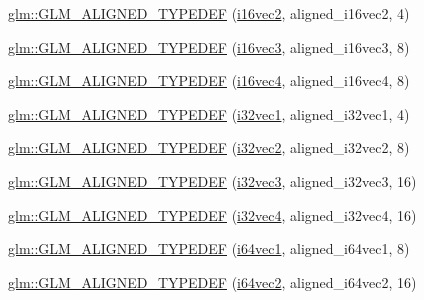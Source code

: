\begin{DoxyCompactItemize}
\hyperlink{group__gtx__type__aligned_ga9d7cb211ccda69b1c22ddeeb0f3e7aba}{glm\+::\+G\+L\+M\+\_\+\+A\+L\+I\+G\+N\+E\+D\+\_\+\+T\+Y\+P\+E\+D\+EF} (\hyperlink{group__gtc__type__precision_ga37af364ff13fb791571dd324dfd3ca89}{i16vec2}, aligned\+\_\+i16vec2, 4)
\item 
\hyperlink{group__gtx__type__aligned_gaaee91dd2ab34423bcc11072ef6bd0f02}{glm\+::\+G\+L\+M\+\_\+\+A\+L\+I\+G\+N\+E\+D\+\_\+\+T\+Y\+P\+E\+D\+EF} (\hyperlink{group__gtc__type__precision_ga85e903f028d903b416a1119b00af57ea}{i16vec3}, aligned\+\_\+i16vec3, 8)
\item 
\hyperlink{group__gtx__type__aligned_ga49f047ccaa8b31fad9f26c67bf9b3510}{glm\+::\+G\+L\+M\+\_\+\+A\+L\+I\+G\+N\+E\+D\+\_\+\+T\+Y\+P\+E\+D\+EF} (\hyperlink{group__gtc__type__precision_gaf074450c0e60b45114084b1df4012a1d}{i16vec4}, aligned\+\_\+i16vec4, 8)
\item 
\hyperlink{group__gtx__type__aligned_ga904e9c2436bb099397c0823506a0771f}{glm\+::\+G\+L\+M\+\_\+\+A\+L\+I\+G\+N\+E\+D\+\_\+\+T\+Y\+P\+E\+D\+EF} (\hyperlink{group__gtc__type__precision_ga05a766bbe2ad0791ed0081baac492da7}{i32vec1}, aligned\+\_\+i32vec1, 4)
\item 
\hyperlink{group__gtx__type__aligned_gaf90651cf2f5e7ee2b11cfdc5a6749534}{glm\+::\+G\+L\+M\+\_\+\+A\+L\+I\+G\+N\+E\+D\+\_\+\+T\+Y\+P\+E\+D\+EF} (\hyperlink{group__gtc__type__precision_ga25820e641988fe33b075d80434872d02}{i32vec2}, aligned\+\_\+i32vec2, 8)
\item 
\hyperlink{group__gtx__type__aligned_ga7354a4ead8cb17868aec36b9c30d6010}{glm\+::\+G\+L\+M\+\_\+\+A\+L\+I\+G\+N\+E\+D\+\_\+\+T\+Y\+P\+E\+D\+EF} (\hyperlink{group__gtc__type__precision_gab67e08f6a4b1bce82a9a34ecb2bfba64}{i32vec3}, aligned\+\_\+i32vec3, 16)
\item 
\hyperlink{group__gtx__type__aligned_gad2ecbdea18732163e2636e27b37981ee}{glm\+::\+G\+L\+M\+\_\+\+A\+L\+I\+G\+N\+E\+D\+\_\+\+T\+Y\+P\+E\+D\+EF} (\hyperlink{group__gtc__type__precision_ga3ada3676600db65a425058c0a150d83e}{i32vec4}, aligned\+\_\+i32vec4, 16)
\item 
\hyperlink{group__gtx__type__aligned_ga965b1c9aa1800e93d4abc2eb2b5afcbf}{glm\+::\+G\+L\+M\+\_\+\+A\+L\+I\+G\+N\+E\+D\+\_\+\+T\+Y\+P\+E\+D\+EF} (\hyperlink{group__gtc__type__precision_ga7ee2c91a98ebd719ae26e15ad89106de}{i64vec1}, aligned\+\_\+i64vec1, 8)
\item 
\hyperlink{group__gtx__type__aligned_ga1f9e9c2ea2768675dff9bae5cde2d829}{glm\+::\+G\+L\+M\+\_\+\+A\+L\+I\+G\+N\+E\+D\+\_\+\+T\+Y\+P\+E\+D\+EF} (\hyperlink{group__gtc__type__precision_ga5a03cb457be28a9a8b9e61163fe648a1}{i64vec2}, aligned\+\_\+i64vec2, 16)

\end{DoxyCompactItemize}
